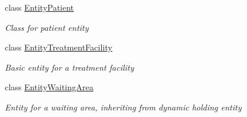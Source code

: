 \begin{DoxyCompactItemize}
class \hyperlink{class_general_health_care_elements_1_1_entities_1_1_entity_patient}{Entity\+Patient}
\begin{DoxyCompactList}\small\item\em Class for patient entity \end{DoxyCompactList}\item 
class \hyperlink{class_general_health_care_elements_1_1_entities_1_1_entity_treatment_facility}{Entity\+Treatment\+Facility}
\begin{DoxyCompactList}\small\item\em Basic entity for a treatment facility \end{DoxyCompactList}\item 
class \hyperlink{class_general_health_care_elements_1_1_entities_1_1_entity_waiting_area}{Entity\+Waiting\+Area}
\begin{DoxyCompactList}\small\item\em Entity for a waiting area, inheriting from dynamic holding entity \end{DoxyCompactList}\end{DoxyCompactItemize}
